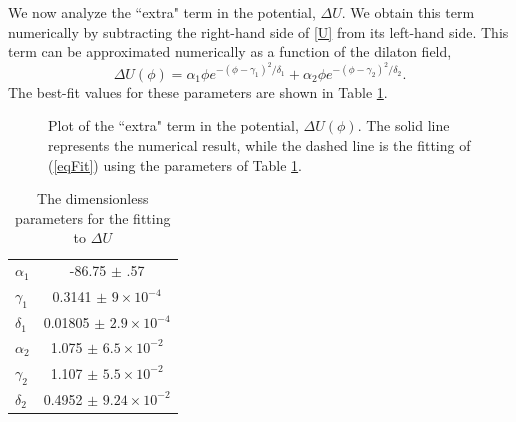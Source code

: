 \documentclass[aps,prd,12pt,nofootinbib]{revtex4}
\newcommand{\be}{\begin{equation}}
\newcommand{\ee}{\end{equation}}
\begin{document}
We now analyze the ``extra" term in the potential, $\Delta U$. 
We obtain this term numerically by subtracting the right-hand side of \ref{U} from its left-hand side.
This term can be approximated numerically as a function of the dilaton field, 
\be
\Delta U\left(\phi\right) = \alpha_1 \phi e^{-\left(\phi-\gamma_1\right)^2/\delta_1 } +   \alpha_2 \phi e^{-\left(\phi-\gamma_2\right)^2/\delta_2 } .
\label{eqFit}
\ee
The best-fit values for these parameters are shown in Table \ref{tabFit}.

\begin{figure}[htb]
\caption{Plot of the ``extra" term in the potential, $\Delta U(\phi)$. The solid line represents the numerical result, while the dashed line is the fitting of (\ref{eqFit}) using the parameters of Table \ref{tabFit}.}
\label{figdeltaU}
\end{figure}

\begin{table}[htb]
\begin{center}
\label{tabFit}
\begin{tabular}{| l | c | }
\hline
$\alpha_1$ & -86.75 $\pm$ .57  \\
$\gamma_1$ & 0.3141 $\pm$ $ 9 \times 10^{-4}$ \\ 
$\delta_1$ & 0.01805 $\pm $ $2.9 \times 10^{-4}$\\ 
$\alpha_2$ & 1.075 $\pm $ $6.5 \times 10^{-2}$  \\
$\gamma_2$& 	1.107 $\pm $ $5.5 \times 10^{-2}$ \\
$\delta_2$ & 0.4952 $\pm $ $9.24 \times 10^{-2} $\\
  \hline
\end{tabular}
\caption{The dimensionless parameters for the fitting to $\Delta U$}
\end{center}
\end{table}
\end{document}
